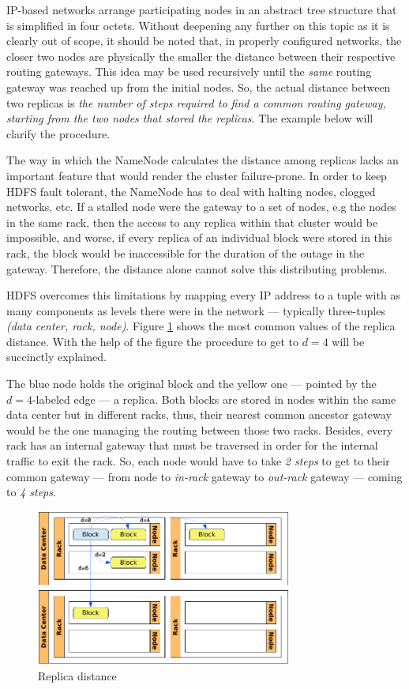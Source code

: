 IP-based networks arrange participating nodes in an abstract tree structure that is simplified in four octets. Without deepening any further on this topic as it is clearly out of scope, it should be noted that, in properly configured networks, the closer two nodes are physically the smaller the distance between their respective routing gateways. This idea may be used recursively until the \emph{same} routing gateway was reached up from the initial nodes. So, the actual distance between two replicas is \emph{the number of steps required to find a common routing gateway, starting from the two nodes that stored the replicas}. The example below will clarify the procedure.

The way in which the NameNode calculates the distance among replicas lacks an  important feature that would render the cluster failure-prone. In order to keep HDFS fault tolerant, the NameNode has to deal with halting nodes, clogged networks, etc. If a stalled node were the gateway to a set of nodes, e.g the nodes in the same rack, then the access to any replica within that cluster would be impossible, and worse, if every replica of an individual block were stored in this rack, the block would be inaccessible for the duration of the outage in the gateway. Therefore, the distance alone cannot solve this distributing problems.

HDFS overcomes this limitations by mapping every IP address to a tuple with as many components as levels there were in the network --- typically three-tuples \emph{(data center, rack, node)}. Figure \ref{fig:distnodos} shows the most common values of the replica distance. With the help of the figure the procedure to get to $d=4$ will be succinctly explained.

The blue node holds the original block and the yellow one --- pointed by the $d=4$-labeled edge --- a replica. Both blocks are stored in nodes within the same data center but in different racks, thus, their nearest common ancestor gateway would be the one managing the routing between those two racks. Besides, every rack has an internal gateway that must be traversed in order for the internal traffic to exit the rack. So, each node would have to take \emph{2 steps} to get to their common gateway --- from node to \emph{in-rack} gateway to \emph{out-rack} gateway --- coming to \emph{4 steps}.

\begin{figure}[tbp]
\begin{center}
\includegraphics[width=0.75\textwidth]{imagenes/018.pdf}
 \caption{Replica distance}
\label{fig:distnodos}
\end{center}
\end{figure}

